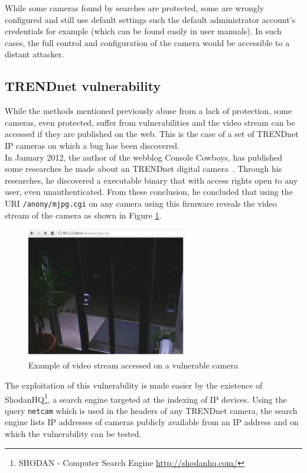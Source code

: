 While some cameras found by searches are protected, some are wrongly configured and still use default settings such the default administrator account's credentials for example (which can be found easily in user manuals).
In such cases, the full control and configuration of the camera would be accessible to a distant attacker.

\subsection{TRENDnet vulnerability}
\label{sec:trendnet-hack}

While the methods mentioned previously abuse from a lack of protection, some cameras, even protected, suffer from vulnerabilities and the video stream can be accessed if they are published on the web.
This is the case of a set of TRENDnet IP cameras on which a bug has been discovered.\\

In January 2012, the author of the webblog Console Cowboys, has published some researches he made about an TRENDnet digital camera~\cite{trendnet-hack}.
Through his researches, he discovered a executable binary that with access rights open to any user, even unauthenticated.
From these conclusion, he concluded that using the URI \texttt{/anony/mjpg.cgi} on any camera using this firmware reveals the video stream of the camera as shown in Figure \ref{fig:trendnet-hack}.\\

\begin{figure}[h]
  \centering
  \includegraphics[width=7cm]{images/trendnet-hack.png}
  \caption{Example of video stream accessed on a vulnerable camera}
  \label{fig:trendnet-hack}
\end{figure}

The exploitation of this vulnerability is made easier by the existence of ShodanHQ\footnote{SHODAN - Computer Search Engine \url{http://shodanhq.com/}}, a search engine targeted at the indexing of IP devices.
Using the query \texttt{netcam} which is used in the headers of any TRENDnet camera, the search engine lists IP addresses of cameras publicly available from an IP address and on which the vulnerability can be tested.\\

